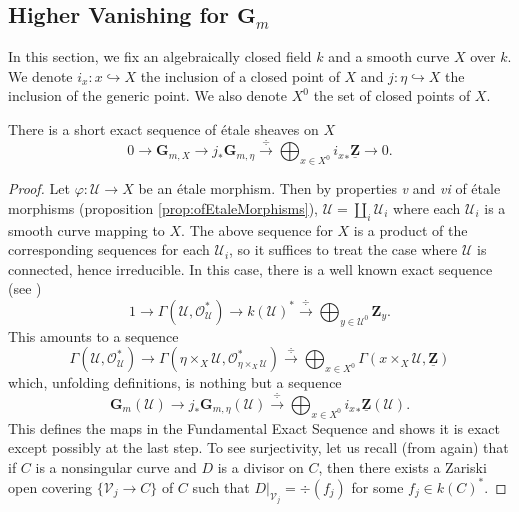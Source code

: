 \subsection{Higher Vanishing for $\mathbf{G}_m$}

In this section, we fix an algebraically closed field $k$ and a smooth curve $X$ over $k$. We denote $i_x : x \hookrightarrow X$ the inclusion of a closed point of $X$ and $j : \eta \hookrightarrow X$ the inclusion of the generic point. We also denote $X^0$ the set of closed points of $X$. 

\begin{theorem}
There is a short exact sequence of \'etale sheaves on $X$
$$
0 \longrightarrow \mathbf{G}_{m,X} \longrightarrow j_* \mathbf{G}_{m,\eta} \xrightarrow{\ \div\ } \bigoplus_{x \in X^0} {i_x}_* \underline{\mathbf{Z}} \longrightarrow 0.
$$
\end{theorem}

\begin{proof}
Let $\varphi : \mathcal{U} \to X$ be an \'etale morphism. Then by properties {\it v} and {\it vi} of \'etale morphisms (proposition \ref{prop:ofEtaleMorphisms}), $\mathcal{U} = \coprod_i \mathcal{U}_i$ where each $\mathcal{U}_i$ is a smooth curve mapping to $X$. The above sequence for $X$ is a product of the corresponding sequences for each $\mathcal{U}_i$, so it suffices to treat the case where $\mathcal{U}$ is connected, hence irreducible. In this case, there is a well known exact sequence (see \cite{Hartshorne})
$$
1 \longrightarrow \Gamma(\mathcal{U},\mathcal{O}_\mathcal{U}^*) \longrightarrow k(\mathcal{U})^* \xrightarrow{\ \div\ } \bigoplus_{y \in \mathcal{U}^0} \mathbf{Z}_y.
$$
This amounts to a sequence
$$
\Gamma(\mathcal{U},\mathcal{O}_\mathcal{U}^*) \longrightarrow \Gamma(\eta\times_X\mathcal{U},\mathcal{O}_{\eta\times_X\mathcal{U}}^*) \xrightarrow{\ \div\ } \bigoplus_{x \in X^0} \Gamma(x\times_X\mathcal{U},\underline{\mathbf{Z}}) 
$$
which, unfolding definitions, is nothing but a sequence
$$
\mathbf{G}_m(\mathcal{U}) \longrightarrow j_* \mathbf{G}_{m,\eta}(\mathcal{U}) \xrightarrow{\ \div\ } \bigoplus_{x \in X^0} {i_x}_* \underline{\mathbf{Z}} (\mathcal{U}).
$$
This defines the maps in the Fundamental Exact Sequence and shows it is exact except possibly at the last step. To see surjectivity, let us recall (from \cite{Hartshorne} again) that if $C$ is a nonsingular curve and $D$ is a divisor on $C$, then there exists a Zariski open covering $\{ \mathcal{V}_j \to C \}$ of $C$ such that $D |_{\mathcal{V}_j} = \div(f_j)$ for some $f_j \in k(C)^*$.
\end{proof}

